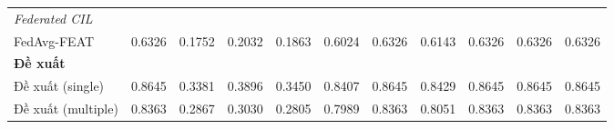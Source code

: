 \begin{table}[H]
{\begin{tabular}{lcccccccccc}
        \hline
        \multicolumn{11}{l}{\textit{Federated CIL}} \\
        FedAvg-FEAT & 0.6326 & 0.1752 & 0.2032 & 0.1863 & 0.6024 & 0.6326 & 0.6143 & 0.6326 & 0.6326 & 0.6326 \\
        \hline
        \multicolumn{11}{l}{\textbf{Đề xuất}} \\
        Đề xuất (single) & \cellcolor{green!60!black}0.8645 & \cellcolor{green!60!black}0.3381 & \cellcolor{green!90!black}0.3896 & \cellcolor{green!90!black}0.3450 & \cellcolor{green!60!black}0.8407 & \cellcolor{green!60!black}0.8645 & \cellcolor{green!60!black}0.8429 & \cellcolor{green!60!black}0.8645 & \cellcolor{green!60!black}0.8645 & \cellcolor{green!60!black}0.8645 \\
        Đề xuất (multiple) & 0.8363 & \cellcolor{green!30}0.2867 & \cellcolor{green!30}0.3030 & \cellcolor{green!30}0.2805 & \cellcolor{green!90!black}0.7989 & 0.8363 & 0.8051 & 0.8363 & 0.8363 & 0.8363 \\
        \hline
    \end{tabular}}
\end{table}

